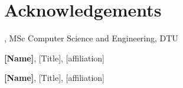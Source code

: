 \section*{Acknowledgements}
\textbf{\thesisauthor}, MSc Computer Science and Engineering, DTU \newline

\textbf{[Name]}, [Title], [affiliation] \newline
[text]

\textbf{[Name]}, [Title], [affiliation] \newline
[text]

